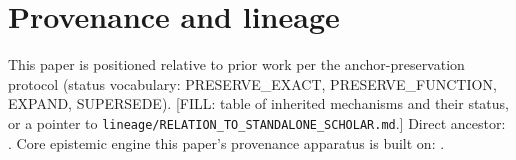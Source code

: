 \documentclass[11pt]{article}
\begin{document}
\section{Provenance and lineage}
\label{sec:provenance}
This paper is positioned relative to prior work per the anchor-preservation
protocol (status vocabulary: \textsc{PRESERVE\_EXACT}, \textsc{PRESERVE\_FUNCTION},
\textsc{EXPAND}, \textsc{SUPERSEDE}). [FILL: table of inherited mechanisms and
their status, or a pointer to \texttt{lineage/RELATION\_TO\_STANDALONE\_SCHOLAR.md}.]
Direct ancestor: \citet{lahtee2026standalone}. Core epistemic engine this
paper's provenance apparatus is built on: \citet{lahtee2026readoutcondition}.



\end{document}
